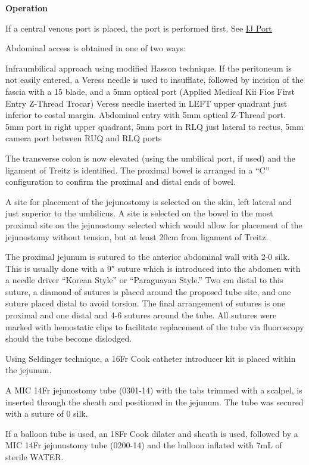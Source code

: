 \documentclass[
]{book}
\begin{document}
\textbf{Operation}

If a central venous port is placed, the port is performed first. See \protect\hyperlink{cv_port_salo}{IJ Port}

Abdominal access is obtained in one of two ways:

Infraumbilical approach using modified Hasson technique. If the peritoneum is not easily entered, a Veress needle is used to insufflate, followed by incision of the fascia with a 15 blade, and a 5mm optical port (Applied Medical Kii Fios First Entry Z-Thread Trocar)
Veress needle inserted in LEFT upper quadrant just inferior to costal margin. Abdominal entry with 5mm optical Z-Thread port.
5mm port in right upper quadrant, 5mm port in RLQ just lateral to rectus, 5mm camera port between RUQ and RLQ ports

The transverse colon is now elevated (using the umbilical port, if used) and the ligament of Treitz is identified. The proximal bowel is arranged in a ``C'' configuration to confirm the proximal and distal ends of bowel.

A site for placement of the jejunostomy is selected on the skin, left lateral and just superior to the umbilicus. A site is selected on the bowel in the most proximal site on the jejunostomy selected which would allow for placement of the jejunostomy without tension, but at least 20cm from ligament of Treitz.

The proximal jejunum is sutured to the anterior abdominal wall with 2-0 silk. This is usually done with a 9″ suture which is introduced into the abdomen with a needle driver ``Korean Style'' or ``Paraguayan Style.'' Two cm distal to this suture, a diamond of sutures is placed around the proposed tube site, and one suture placed distal to avoid torsion. The final arrangement of sutures is one proximal and one distal and 4-6 sutures around the tube. All sutures were marked with hemostatic clips to facilitate replacement of the tube via fluoroscopy should the tube become dislodged.

Using Seldinger technique, a 16Fr Cook catheter introducer kit is placed within the jejunum.

A MIC 14Fr jejunostomy tube (0301-14) with the tabs trimmed with a scalpel, is inserted through the sheath and positioned in the jejunum. The tube was secured with a suture of 0 silk.

If a balloon tube is used, an 18Fr Cook dilater and sheath is used, followed by a MIC 14Fr jejunustomy tube (0200-14) and the balloon inflated with 7mL of sterile WATER.
\end{document}
